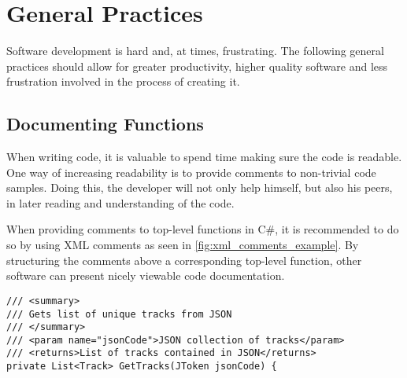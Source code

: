 \chapter{General Practices}
\label{imp:general_practices}

Software development is hard and, at times, frustrating. The following
general practices should allow for greater productivity, higher
quality software and less frustration involved in the process of creating it.

\section{Documenting Functions}
When writing code, it is valuable to spend time making sure the
code is readable. One way of increasing readability is to provide comments
to non-trivial code samples. Doing this, the developer will not only
help himself, but also his peers, in later reading and understanding of the code.

When providing comments to top-level functions in C\#, it is
recommended to do so by using XML comments as seen in
\cref{fig:xml_comments_example}. By structuring the comments above a
corresponding top-level function, other software can present nicely
viewable code documentation.

\begin{lstlisting}[caption = {Example of XML-comments on top of C\# function.}, label={fig:xml_comments_example}]
/// <summary>
/// Gets list of unique tracks from JSON
/// </summary>
/// <param name="jsonCode">JSON collection of tracks</param>
/// <returns>List of tracks contained in JSON</returns>
private List<Track> GetTracks(JToken jsonCode) {
\end{lstlisting}
